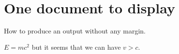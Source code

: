 \documentclass{book}
\begin{document}
\section{One document to display}

How to produce an output without any margin.

\par\noindent $ E = m c^2 $ but it seems that we can have $ v > c $.
\end{document}
